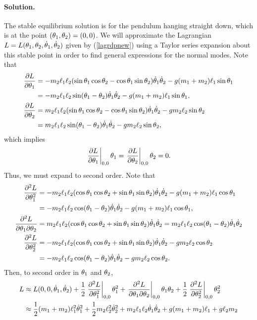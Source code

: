 \documentclass[11pt]{article}
\newcommand{\refeq}[1]{(\ref{#1})}
\newenvironment{solution}
{
    \paragraph{Solution.}
    \ignorespaces
}
{
    \bigskip
}
\begin{document}
\begin{solution}
	The stable equilibrium solution is for the pendulum hanging straight down, which is at the point $(\theta_1, \theta_2) = (0, 0)$.  We will approximate the Lagrangian $L = L(\theta_1, \theta_2, \dot{\theta}_1, \dot{\theta}_2)$ given by \refeq{lagrdpnew} using a Taylor series expansion about this stable point in order to find general expressions for the normal modes.  Note that
	\begin{align}
		\pdv{L}{\theta_1} &= -m_2 \ell_1 \ell_2 (\sin{\theta_1} \cos{\theta_2} - \cos{\theta_1} \sin{\theta_2}) \dot{\theta}_1 \dot{\theta}_2 - g (m_1 + m_2) \ell_1 \sin{\theta_1} \\
		&= -m_2 \ell_1 \ell_2 \sin(\theta_1 - \theta_2) \dot{\theta}_1 \dot{\theta}_2 - g (m_1 + m_2) \ell_1 \sin{\theta_1}, \\
		\pdv{L}{\theta_2} &= m_2 \ell_1 \ell_2 (\sin{\theta_1} \cos{\theta_2} - \cos{\theta_1} \sin{\theta_2}) \dot{\theta}_1 \dot{\theta}_2 - g m_2 \ell_2 \sin{\theta_2} \\
		&= m_2 \ell_1 \ell_2 \sin(\theta_1 - \theta_2) \dot{\theta}_1 \dot{\theta}_2 - g m_2 \ell_2 \sin{\theta_2},
	\end{align}
	which implies
	\begin{equation}
		\left. \pdv{L}{\theta_1}\right|_{0, 0} \theta_1 = \left. \pdv{L}{\theta_2}\right|_{0, 0} \theta_2 = 0.
	\end{equation}
	Thus, we must expand to second order.  Note that
	\begin{align}
		\pdv[2]{L}{\theta_1} &= -m_2 \ell_1 \ell_2 (\cos{\theta_1} \cos{\theta_2} + \sin{\theta_1} \sin{\theta_2}) \dot{\theta}_1 \dot{\theta}_2 - g (m_1 + m_2) \ell_1 \cos{\theta_1} \\
		&= -m_2 \ell_1 \ell_2 \cos(\theta_1 - \theta_2) \dot{\theta}_1 \dot{\theta}_2 - g (m_1 + m_2) \ell_1 \cos{\theta_1}, \\
		\pdv[2]{L}{\theta_1}{\theta_2} &= m_2 \ell_1 \ell_2 (\cos{\theta_1} \cos{\theta_2} + \sin{\theta_1} \sin{\theta_2}) \dot{\theta}_1 \dot{\theta}_2 = m_2 \ell_1 \ell_2 \cos(\theta_1 - \theta_2) \dot{\theta}_1 \dot{\theta}_2 \\
		\pdv[2]{L}{\theta_2} &= -m_2 \ell_1 \ell_2 (\cos{\theta_1} \cos{\theta_2} + \sin{\theta_1} \sin{\theta_2}) \dot{\theta}_1 \dot{\theta}_2 - g m_2 \ell_2 \cos{\theta_2} \\
		&= -m_2 \ell_1 \ell_2 \cos(\theta_1 - \theta_2) \dot{\theta}_1 \dot{\theta}_2 - g m_2 \ell_2 \cos{\theta_2}.
	\end{align}
	Then, to second order in $\theta_1$ and $\theta_2$, %
	\begin{align}
		L &\approx L(0, 0, \thdq, \thdw) + \frac{1}{2} \left. \pdv[2]{L}{\thq}\right|_{0, 0} \thq^2 + \left. \pdv[2]{L}{\thq}{\thw}\right|_{0, 0} \thq \thw + \frac{1}{2} \left. \pdv[2]{L}{\thw}\right|_{0, 0} \thw^2 \\
		&\approx \frac{1}{2} (\mq + \mw) \elq^2 \thdq^2 + \frac{1}{2} \mw \elw^2 \thdw^2 + \mw \elq \elw \thdq \thdw + g (\mq + \mw) \elq + g \elw \mw \notag \\

\end{align}
\end{solution}
\end{document}
